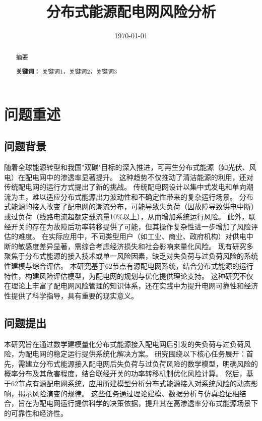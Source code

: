 \documentclass{article}
\title{分布式能源配电网风险分析}
\author{}
\date{\today}
\begin{document}
\maketitle

\begin{abstract}\label{sec:abstract}
  摘要

  \textbf{关键词：} 关键词1，关键词2，关键词3
\end{abstract}

\newpage

\section{问题重述}\label{sec:problem}

\subsection{问题背景}\label{sec:background}

随着全球能源转型和我国"双碳"目标的深入推进，可再生分布式能源（如光伏、风电）在配电网中的渗透率显著提升。
这种趋势不仅推动了清洁能源的利用，还对传统配电网的运行方式提出了新的挑战。
传统配电网设计以集中式发电和单向潮流为主，难以适应分布式能源出力波动性和不确定性带来的复杂运行场景。
分布式能源的接入改变了配电网的潮流分布，可能导致失负荷（因故障导致供电中断）或过负荷（线路电流超额定载流量10\%以上），从而增加系统运行风险。
此外，联经开关的存在为故障后功率转移提供了可能，但其操作复杂性进一步增加了风险评估的难度。
在实际应用中，不同类型用户（如工业、商业、政府机构）对供电中断的敏感度差异显著，需综合考虑经济损失和社会影响来量化风险。
现有研究多聚焦于分布式能源的接入技术或单一风险因素，缺乏对失负荷与过负荷风险的系统性建模与综合评估。
本研究基于62节点有源配电网系统，结合分布式能源的运行特性，构建风险评估模型，为配电网的规划与优化提供理论支持。
这种研究不仅在理论上丰富了配电网风险管理的知识体系，还在实践中为提升电网可靠性和经济性提供了科学指导，具有重要的现实意义。

\subsection{问题提出}\label{sec:problem_proposed}

本研究旨在通过数学建模量化分布式能源接入配电网后引发的失负荷与过负荷风险，为配电网的稳定运行提供系统化解决方案。
研究围绕以下核心任务展开：首先，需建立分布式能源接入配电网后失负荷与过负荷风险的数学模型，明确风险的概率分布及其危害程度，结合联经开关的功率转移机制优化风险计算。
然后，基于62节点有源配电网系统，应用所建模型分析分布式能源接入对系统风险的动态影响，揭示风险演变的规律。
这些任务通过理论建模、数据分析与仿真验证相结合，旨在为配电网运行提供科学的决策依据，提升其在高渗透率分布式能源场景下的可靠性和经济性。
\end{document}
